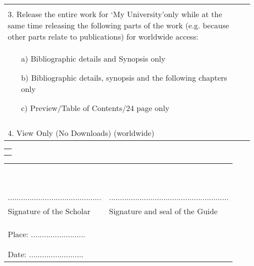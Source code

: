 \begin{tabular}{|p{10cm}|p{5cm}|}
 & \\ \hline
 & \\ [-1em]
 3. Release the entire work for \lq My University\rq  only while at the same time releasing the following parts of the work (e.g. because other parts relate to publications) for worldwide access: &  \\
\begin{enumerate} \item[a)] Bibliographic details and Synopsis only \item[b)] Bibliographic details, synopsis and the following chapters only \item[c)] Preview/Table of Contents/24 page only \end{enumerate} & \\ \hline
 & \\ [-1em]
4. View Only (No Downloads) (worldwide) & \\ \hline
\end{tabular}
%
%
%
\begin{tabular}{c}
 \\
 \\
 \\
\end{tabular}
%
%
%
\begin{tabular}{p{7cm}p{8cm}}
 & \\
 & \\
 & \\
 & \\
 & \\
 & \\
 & \\
 & \\
 & \\
........................................... & \hspace{2cm} ....................................................... \\
Signature of the Scholar & \hspace{2cm} Signature and seal of the Guide \\
 & \\
 & \\
 & \\
Place: ......................... & \\
 & \\
 & \\
Date: ......................... &
\end{tabular}
